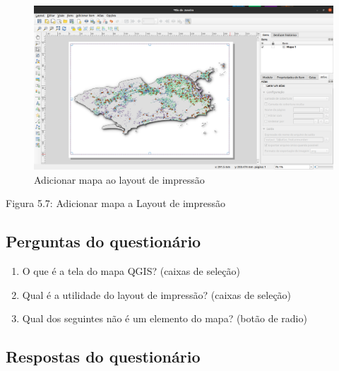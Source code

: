 \documentclass[
  portuguese,
]{krantz}
\providecommand{\tightlist}{%
  \setlength{\itemsep}{0pt}\setlength{\parskip}{0pt}}
\begin{document}
\begin{figure}
\centering
\includegraphics{media/modulo5/print-layout-map.png}
\caption{Adicionar mapa ao layout de impressão}
\end{figure}

Figura 5.7: Adicionar mapa a Layout de impressão

\hypertarget{perguntas-do-questionuxe1rio-9}{%
\subsection{\texorpdfstring{\textbf{Perguntas do questionário }}{Perguntas do questionário }}\label{perguntas-do-questionuxe1rio-9}}

\begin{enumerate}
\def\labelenumi{\arabic{enumi}.}
\tightlist
\item
  O que é a tela do mapa QGIS? (caixas de seleção)
\item
  Qual é a utilidade do layout de impressão? (caixas de seleção)
\item
  Qual dos seguintes não é um elemento do mapa? (botão de radio)
\end{enumerate}

\hypertarget{respostas-do-questionuxe1rio-1}{%
\subsection{\texorpdfstring{\textbf{Respostas do questionário }}{Respostas do questionário }}\label{respostas-do-questionuxe1rio-1}}
\end{document}
